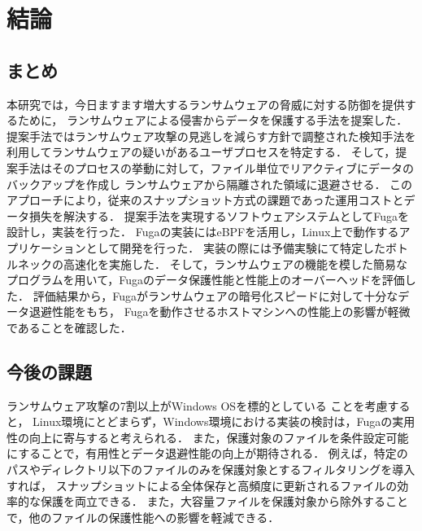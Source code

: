 \chapter{結論}
\label{chap:conclusion}
\section{まとめ}
本研究では，今日ますます増大するランサムウェアの脅威に対する防御を提供するために，
ランサムウェアによる侵害からデータを保護する手法を提案した．
提案手法ではランサムウェア攻撃の見逃しを減らす方針で調整された検知手法を利用してランサムウェアの疑いがあるユーザプロセスを特定する．
そして，提案手法はそのプロセスの挙動に対して，ファイル単位でリアクティブにデータのバックアップを作成し
ランサムウェアから隔離された領域に退避させる．
このアプローチにより，従来のスナップショット方式の課題であった運用コストとデータ損失を解決する．
提案手法を実現するソフトウェアシステムとしてFugaを設計し，実装を行った．
Fugaの実装にはeBPFを活用し，Linux上で動作するアプリケーションとして開発を行った．
実装の際には予備実験にて特定したボトルネックの高速化を実施した．
そして，ランサムウェアの機能を模した簡易なプログラムを用いて，Fugaのデータ保護性能と性能上のオーバーヘッドを評価した．
評価結果から，Fugaがランサムウェアの暗号化スピードに対して十分なデータ退避性能をもち，
Fugaを動作させるホストマシンへの性能上の影響が軽微であることを確認した．

\section{今後の課題}
ランサムウェア攻撃の7割以上がWindows OSを標的としている \cite{trendmicro-report} ことを考慮すると，
Linux環境にとどまらず，Windows環境における実装の検討は，Fugaの実用性の向上に寄与すると考えられる．
また，保護対象のファイルを条件設定可能にすることで，有用性とデータ退避性能の向上が期待される．
例えば，特定のパスやディレクトリ以下のファイルのみを保護対象とするフィルタリングを導入すれば，
スナップショットによる全体保存と高頻度に更新されるファイルの効率的な保護を両立できる．
また，大容量ファイルを保護対象から除外することで，他のファイルの保護性能への影響を軽減できる．


